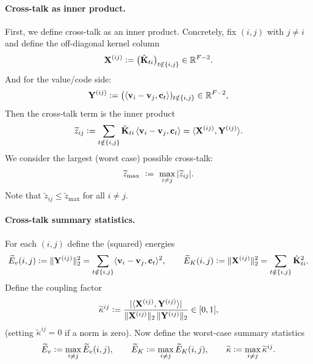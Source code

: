 \paragraph{Cross-talk as inner product.} First, we define cross-talk as an inner product. Concretely, fix $(i,j)$ with $j\neq i$ and define the off-diagonal kernel column
\begin{equation}
\mathbf{X}^{(ij)} \vcentcolon= \big(\hat{\mathbf{K}}_{ti}\big)_{t\notin \{i,j\}}\in\mathbb{R}^{F-2}.
\label{eq:Xdef}
\end{equation}
And for the value/code side:
\begin{equation}
\mathbf{Y}^{(ij)} \vcentcolon= \big(\langle {{\mathbf{v}}_{i}-{\mathbf{v}}_j}, {{\mathbf{c}}_t} \rangle)_{t\notin \{ i,j\}}\in\mathbb{R}^{F-2},
\label{eq:Ydef}
\end{equation}
Then the cross-talk term is the inner product
\begin{equation}
 \widetilde{z}_{ij}
 \vcentcolon= \sum_{t\notin\{i,j\}}\hat{\mathbf{K}}_{ti}\,\langle {{\mathbf{v}}_{i}-{\mathbf{v}}_j}, {{\mathbf{c}}_t} \rangle
 =\langle {\mathbf{X}^{(ij)}}, {\mathbf{Y}^{(ij)}} \rangle.
 \label{eq:Zij}
\end{equation}
We consider the largest (worst case) possible cross-talk:
\begin{equation}
 \widetilde{z}_{\max}\ \defeq\ \max_{i\neq j}|\widetilde{z}_{ij}|.
 \label{eq:zmax}
\end{equation}
Note that $\widetilde{z}_{ij}\le \widetilde{z}_{\max}$ for all $i\neq j$.


\paragraph{Cross-talk summary statistics.} For each $(i,j)$ define the (squared) energies
\begin{equation}
\widetilde{E}_{v}(i,j) \vcentcolon= \|\mathbf{Y}^{(ij)} \|_{2}^2 = \sum_{t\notin\{i,j\}}\langle {{\mathbf{v}}_{i}-{\mathbf{v}}_j}, {{\mathbf{c}}_t} \rangle^2,
\qquad
\widetilde{E}_{K}(i,j) \vcentcolon= \|\mathbf{X}^{(ij)} \|_{2}^2 = \sum_{t\notin\{i,j\}}\hat{\mathbf{K}}_{ti}^2.
\label{eq:EvEk}
\end{equation}
Define the coupling factor
\begin{equation}
\widetilde{\kappa}^{ij} \vcentcolon= \frac{|\langle {\mathbf{X}^{(ij)}}, {\mathbf{Y}^{(ij)}} \rangle|}{\|\mathbf{X}^{(ij)} \|_{2}\,\|\mathbf{Y}^{(ij)} \|_2}\in[0,1],
\label{eq:kappaij}
\end{equation}
(setting $\widetilde{\kappa}^{ij}=0$ if a norm is zero).
Now define the worst-case summary statistics
\begin{equation}
\widetilde{E}_{v} \vcentcolon= \max_{i\neq j} \widetilde{E}_{v}(i,j),
\qquad
\widetilde{E}_{K} \vcentcolon= \max_{i\neq j} \widetilde{E}_{K}(i,j),
\qquad
\widetilde{\kappa} \vcentcolon= \max_{i\neq j} \widetilde{\kappa}^{ij}.
\label{eq:summary-stats}
\end{equation}

